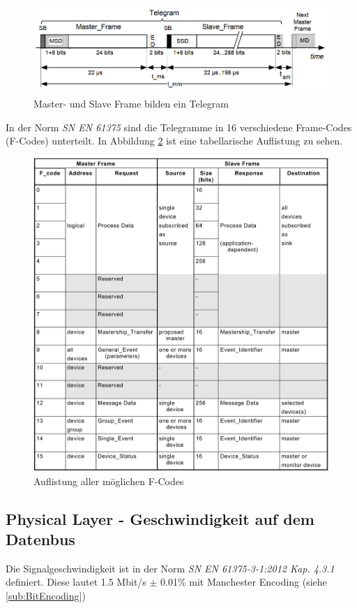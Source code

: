 \begin{figure}[H]
    \centering
    \includegraphics[width=0.85\linewidth]{Figures/Chap2/Grundlagen/MVB_DOKU/Frames und Telegramme/Fig39_Telegamm_definition.png}
    \caption{Master- und Slave Frame bilden ein Telegram}
    \label{fig:Fig39_Telegamm_definition.png}
\end{figure}

In der Norm \textit{SN EN 61375} sind die Telegramme in 16 verschiedene Frame-Codes (F-Codes) unterteilt. In Abbildung \ref{fig:FCodeListe} ist eine tabellarische Auflistung zu sehen. 

\begin{figure}[H]
    \centering
    \includegraphics[width=0.9\linewidth]{Figures/Chap2/Grundlagen/MVB_DOKU/Frames und Telegramme/F-Code Liste.png}
    \caption{Auflistung aller möglichen F-Codes}
    \label{fig:FCodeListe}
\end{figure}

\subsection{Physical Layer - Geschwindigkeit auf dem Datenbus}
\label{sub:GeschwindigkeitDatenbus}
Die Signalgeschwindigkeit ist in der Norm \textit{SN EN 61375-3-1:2012 Kap. 4.3.1} definiert. Diese lautet 1.5 Mbit/s $\pm$ 0.01\% mit Manchester Encoding (siehe \ref{sub:BitEncoding})

